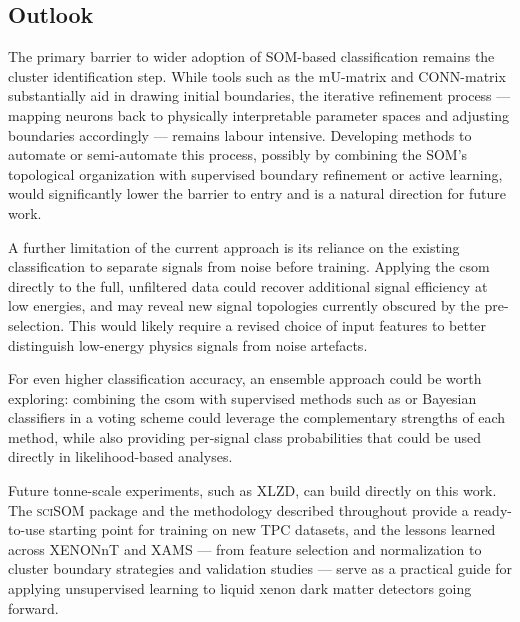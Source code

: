\subsection{Outlook}

The primary barrier to wider adoption of SOM-based classification remains the cluster identification step. While tools such as the mU-matrix and CONN-matrix substantially aid in drawing initial boundaries, the iterative refinement process — mapping neurons back to physically interpretable parameter spaces and adjusting boundaries accordingly — remains labour intensive. Developing methods to automate or semi-automate this process, possibly by combining the SOM's topological organization with supervised boundary refinement or active learning, would significantly lower the barrier to entry and is a natural direction for future work.

A further limitation of the current approach is its reliance on the existing classification to separate signals from noise before training. Applying the \acrshort{csom} directly to the full, unfiltered data could recover additional signal efficiency at low energies, and may reveal new signal topologies currently obscured by the pre-selection. This would likely require a revised choice of input features to better distinguish low-energy physics signals from noise artefacts.

For even higher classification accuracy, an ensemble approach could be worth exploring: combining the \acrshort{csom} with supervised methods such as  or Bayesian classifiers in a voting scheme could leverage the complementary strengths of each method, while also providing per-signal class probabilities that could be used directly in likelihood-based analyses.

Future tonne-scale experiments, such as XLZD, can build directly on this work. The \textsc{sciSOM} package and the methodology described throughout provide a ready-to-use starting point for training  on new TPC datasets, and the lessons learned across XENONnT and XAMS — from feature selection and normalization to cluster boundary strategies and validation studies — serve as a practical guide for applying unsupervised learning to liquid xenon dark matter detectors going forward.
